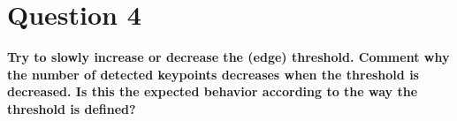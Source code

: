 \section*{Question 4}

{\bfseries Try to slowly increase or decrease the (edge) threshold. Comment
why the number of detected keypoints decreases when the threshold is decreased.
Is this the expected behavior according to the way the threshold is defined?}